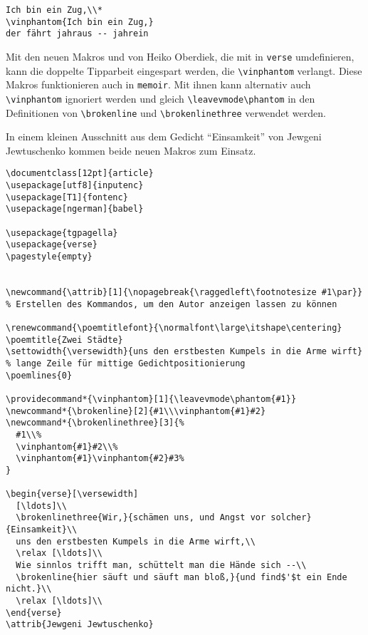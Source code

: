 \begin{lstlisting}
Ich bin ein Zug,\\*
\vinphantom{Ich bin ein Zug,}
der fährt jahraus -- jahrein
\end{lstlisting}

Mit den neuen Makros  und 
von Heiko Oberdiek, die 
mit  in \texttt{verse} umdefinieren, kann die doppelte
Tipparbeit eingespart werden, die \verb|\vinphantom| verlangt. Diese Makros 
funktionieren auch in \texttt{memoir}.
Mit ihnen kann alternativ auch \verb|\vinphantom| ignoriert werden und gleich 
\verb|\leavevmode\phantom| in den Definitionen von \verb|\brokenline| und 
\verb|\brokenlinethree| verwendet werden.

In einem kleinen Ausschnitt aus dem Gedicht "`Einsamkeit"' von Jewgeni Jewtuschenko
kommen beide neuen Makros zum Einsatz.


\begin{lstlisting}
\documentclass[12pt]{article}
\usepackage[utf8]{inputenc}
\usepackage[T1]{fontenc}
\usepackage[ngerman]{babel}

\usepackage{tgpagella}
\usepackage{verse}
\pagestyle{empty}


\newcommand{\attrib}[1]{\nopagebreak{\raggedleft\footnotesize #1\par}}
% Erstellen des Kommandos, um den Autor anzeigen lassen zu können

\renewcommand{\poemtitlefont}{\normalfont\large\itshape\centering}
\poemtitle{Zwei Städte}
\settowidth{\versewidth}{uns den erstbesten Kumpels in die Arme wirft}
% lange Zeile für mittige Gedichtpositionierung
\poemlines{0}

\providecommand*{\vinphantom}[1]{\leavevmode\phantom{#1}}
\newcommand*{\brokenline}[2]{#1\\\vinphantom{#1}#2}
\newcommand*{\brokenlinethree}[3]{%
  #1\\%
  \vinphantom{#1}#2\\%
  \vinphantom{#1}\vinphantom{#2}#3%
}

\begin{verse}[\versewidth]
  [\ldots]\\ 
  \brokenlinethree{Wir,}{schämen uns, und Angst vor solcher}{Einsamkeit}\\
  uns den erstbesten Kumpels in die Arme wirft,\\
  \relax [\ldots]\\
  Wie sinnlos trifft man, schüttelt man die Hände sich --\\
  \brokenline{hier säuft und säuft man bloß,}{und find$'$t ein Ende nicht.}\\
  \relax [\ldots]\\
\end{verse}
\attrib{Jewgeni Jewtuschenko}


\end{lstlisting}

